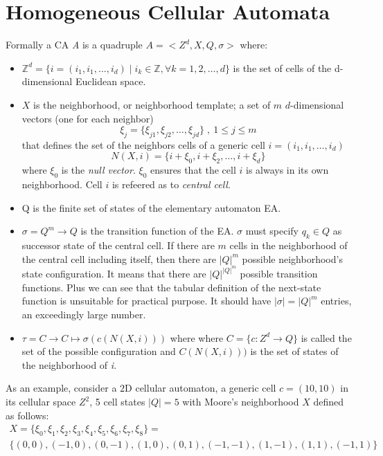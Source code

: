 \section{Homogeneous Cellular Automata}\label{homogeneousCellularAutomata}
Formally a CA \emph{A} is a quadruple $ A=<Z^d,X,Q,\sigma>$
where:
\begin{itemize}
  \item $\mathbb{Z}^d=\{i=(i_1,i_1,\ldots,i_d)\mid i_k \in
  \mathbb{Z}, \forall k=1,2,\ldots,d \}$ is the set of cells of the d-dimensional
   Euclidean space.
  \item $X$ is the neighborhood, or neighborhood template; a
  set of $m$ $d$-dimensional vectors (one for each neighbor)
  \[\xi_j=\{\xi_{j1},\xi_{j2},\ldots,\xi_{jd}\} \;,\: 1\leq j \leq m\] that
  defines the set of the neighbors cells of a generic cell
  $i=(i_1,i_1,\ldots,i_d)$
  \[
  N(X,i)=\{i+\xi_0,i+\xi_2,\ldots,i+\xi_d\}
  \] where $\xi_0$ is the \textit{null vector}. $\xi_0$ ensures that the
  cell $i$ is always in its own neighborhood.  Cell $i$ is refeered as to \emph{central cell}.

\item Q is the finite set of states of the elementary automaton EA.
  
  \item $\sigma=Q^m \rightarrow Q $ is the transition
  function of the EA. $\sigma$ must specify
  $q_k \in Q $ as successor  state of the central cell.
  If there are $m$ cells in the neighborhood of the central
  cell including itself, then there are
  ${\left\vert{Q}\right\vert}^m$ possible neighborhood's
  state configuration. It  means that there are
  ${\left\vert{Q}\right\vert}^{{\left\vert{Q}\right\vert}^m}$
  possible transition functions. Plus we can see that the tabular definition of
  the next-state function is unsuitable for practical purpose. It should have
  $\left\vert{\sigma}\right\vert={\left\vert{Q}\right\vert}^m$
  entries, an exceedingly large number.
  \item $\tau=C \longrightarrow C \longmapsto
  \sigma(c(N(X,i))) $ where 
  where $C=\{c \colon Z^d
  \rightarrow Q\}$
  is called the set of the possible configuration and 
  $
  C(N(X,i)))$ is the set of states of the neighborhood of \textit{i}.
\end{itemize}
As an example, consider a $2$D cellular automaton, a
generic cell $c=(10,10)$ in its cellular space $Z^2$, 5 cell states  ${\left\vert{Q}\right\vert}=5$ with Moore's neighborhood  $X$ defined as follows:
\begin{gather*}
X=\{\xi_{0},\xi_{1},\xi_{2},\xi_{3},\xi_{4},\xi_{5},\xi_{6},\xi_{7},\xi_{8}\}
=\\ \{(0,0),(-1,0),(0,-1),(1,0),(0,1),(-1,-1),(1,-1),(1,1),(-1,1)\}
\end{gather*}

